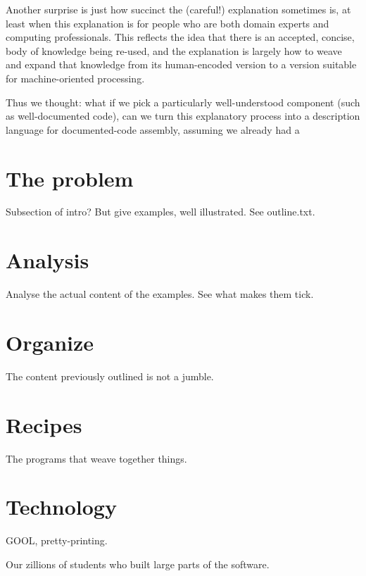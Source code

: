 \documentclass[english,submission]{programming}
\begin{document}
Another surprise is just how succinct the (careful!) explanation sometimes is, at
least when this explanation is for people who are both domain experts and computing
professionals. This reflects the idea that there is an accepted, concise, body of
knowledge being re-used, and the explanation is largely how to weave and expand that
knowledge from its human-encoded version to a version suitable for machine-oriented
processing.

Thus we thought: what if we pick a particularly well-understood component (such as
well-documented code), can we turn this explanatory process into a description
language for documented-code assembly, assuming we already had a 

\section{The problem}
\label{sec:problem}

Subsection of intro? But give examples, well illustrated. See outline.txt.

\section{Analysis}
\label{sec:analysis}

Analyse the actual content of the examples. See what makes them tick.

\section{Organize}

The content previously outlined is not a jumble.

\section{Recipes}

The programs that weave together things.

\section{Technology}

GOOL, pretty-printing.

\acks
Our zillions of students who built large parts of the software.

\end{document}
